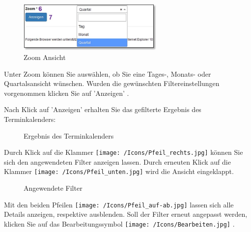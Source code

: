 
\vspace{\baselineskip}

\begin{figure}
  \vspace{-30pt}
  \begin{center}
    \includegraphics[height=25mm]{../chapters/04_Terminplanung/pictures/4-3_Zoom-Ansicht.jpg}
  \end{center}
  \vspace{-20pt}
  \caption{Zoom Ansicht}
  \vspace{-10pt}
\end{figure}
Unter Zoom  können Sie auswählen, ob Sie eine Tages-, Monats- oder Quartalsansicht wünschen. Wurden die gewünschten Filtereinstellungen vorgenommen klicken Sie auf 'Anzeigen' .

\vspace{\baselineskip}
\vspace{\baselineskip}

Nach Klick auf 'Anzeigen' erhalten Sie das gefilterte Ergebnis des Terminkalenders:

\begin{figure}[H]
\caption{Ergebnis des Terminkalenders}
\end{figure}

Durch Klick auf die Klammer \texttt{[image: /Icons/Pfeil\_rechts.jpg]}  können Sie sich den angewendeten Filter anzeigen lassen. Durch erneuten Klick auf die Klammer \texttt{[image: /Icons/Pfeil\_unten.jpg]}  wird die Ansicht eingeklappt.

\begin{figure}[H]
\caption{Angewendete Filter}
\end{figure}

Mit den beiden Pfeilen \texttt{[image: /Icons/Pfeil\_auf-ab.jpg]}  lassen sich alle Details anzeigen, respektive ausblenden. Soll der Filter erneut angepasst werden, klicken Sie auf das Bearbeitungssymbol \texttt{[image: /Icons/Bearbeiten.jpg]} .
